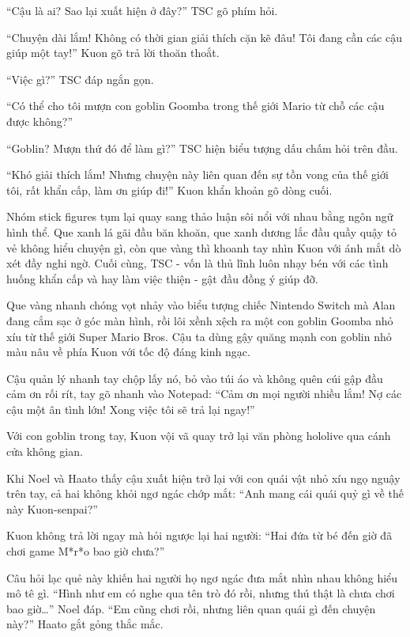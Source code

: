 \documentclass[../main.tex]{subfiles}
\begin{document}
``Cậu là ai? Sao lại xuất hiện ở đây?'' TSC gõ phím hỏi.

``Chuyện dài lắm! Không có thời gian giải thích cặn kẽ đâu! Tôi đang cần các cậu giúp một tay!'' Kuon gõ trả lời thoăn thoắt.

``Việc gì?'' TSC đáp ngắn gọn.

``Có thể cho tôi mượn con goblin Goomba trong thế giới Mario từ chỗ các cậu được không?''

``Goblin? Mượn thứ đó để làm gì?'' TSC hiện biểu tượng dấu chấm hỏi trên đầu.

``Khó giải thích lắm! Nhưng chuyện này liên quan đến sự tồn vong của thế giới tôi, rất khẩn cấp, làm ơn giúp đi!'' Kuon khẩn khoản gõ dòng cuối.

Nhóm stick figures tụm lại quay sang thảo luận sôi nổi với nhau bằng ngôn ngữ hình thể. Que xanh lá gãi đầu băn khoăn, que xanh dương lắc đầu quầy quậy tỏ vẻ không hiểu chuyện gì, còn que vàng thì khoanh tay nhìn Kuon với ánh mắt dò xét đầy nghi ngờ. Cuối cùng, TSC - vốn là thủ lĩnh luôn nhạy bén với các tình huống khẩn cấp và hay làm việc thiện - gật đầu đồng ý giúp đỡ.

Que vàng nhanh chóng vọt nhảy vào biểu tượng chiếc Nintendo Switch mà Alan đang cắm sạc ở góc màn hình, rồi lôi xềnh xệch ra một con goblin Goomba nhỏ xíu từ thế giới Super Mario Bros. Cậu ta dùng gậy quăng mạnh con goblin nhỏ màu nâu về phía Kuon với tốc độ đáng kinh ngạc.

Cậu quản lý nhanh tay chộp lấy nó, bỏ vào túi áo và không quên cúi gập đầu cảm ơn rối rít, tay gõ nhanh vào Notepad: ``Cảm ơn mọi người nhiều lắm! Nợ các cậu một ân tình lớn! Xong việc tôi sẽ trả lại ngay!''

Với con goblin trong tay, Kuon vội vã quay trở lại văn phòng hololive qua cánh cửa không gian.

\ct

Khi Noel và Haato thấy cậu xuất hiện trở lại với con quái vật nhỏ xíu ngọ nguậy trên tay, cả hai không khỏi ngơ ngác chớp mắt: ``Anh mang cái quái quỷ gì về thế này Kuon-senpai?''

Kuon không trả lời ngay mà hỏi ngược lại hai người: ``Hai đứa từ bé đến giờ đã chơi game M*r*o bao giờ chưa?''

Câu hỏi lạc quẻ này khiến hai người họ ngơ ngác đưa mắt nhìn nhau không hiểu mô tê gì. ``Hình như em có nghe qua tên trò đó rồi, nhưng thú thật là chưa chơi bao giờ\dots'' Noel đáp. ``Em cũng chơi rồi, nhưng liên quan quái gì đến chuyện này?'' Haato gắt gỏng thắc mắc.
\end{document}
